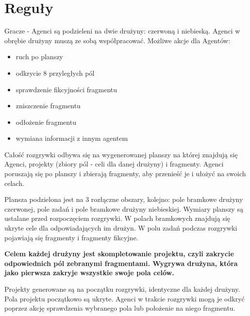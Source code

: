 \documentclass[Dokumentacja.tex]{subfiles}
\begin{document}
\section{Reguły}
Gracze - Agenci są podzieleni na dwie drużyny: czerwoną i niebieską. Agenci w obrębie drużyny muszą ze sobą współpracować. Możliwe akcje dla Agentów:
\begin{itemize}
	\item ruch po planszy
	\item odkrycie 8 przyległych pól
	\item sprawdzenie fikcyjności fragmentu
	\item zniszczenie fragmentu
	\item odłożenie fragmentu
	\item wymiana informacji z innym agentem
\end{itemize}

Całość rozgrywki odbywa się na wygenerowanej planszy na której znajdują się Agenci, projekty (zbiory pól - celi dla danej drużyny) i fragmenty.  Agenci poruszają się po planszy i zbierają fragmenty, aby przenieść je i ułożyć na swoich celach.

Plansza podzielona jest na 3 rozłączne obszary, kolejno: pole bramkowe drużyny czerwonej, pole zadań i pole bramkowe drużyny niebieskiej. Wymiary planszy są ustalane przed rozpoczęciem rozgrywki. W polach bramkowych znajdują się ukryte cele dla odpowiadających im drużyn. W polu zadań podczas rozgrywki pojawiają się fragmenty i fragmenty fikcyjne.

\textbf{Celem każdej drużyny jest skompletowanie projektu, czyli zakrycie odpowiednich pól zebranymi fragmentami. Wygrywa drużyna, która jako pierwsza zakryje wszystkie swoje pola celów.}

Projekty generowane są na początku rozgrywki, identyczne dla każdej drużyny. Pola projektu początkowo są ukryte. Agenci w trakcie rozgrywki mogą je odkryć poprzez akcję sprawdzenia wybranego pola lub położenie na niego fragmentu.

\end{document}
